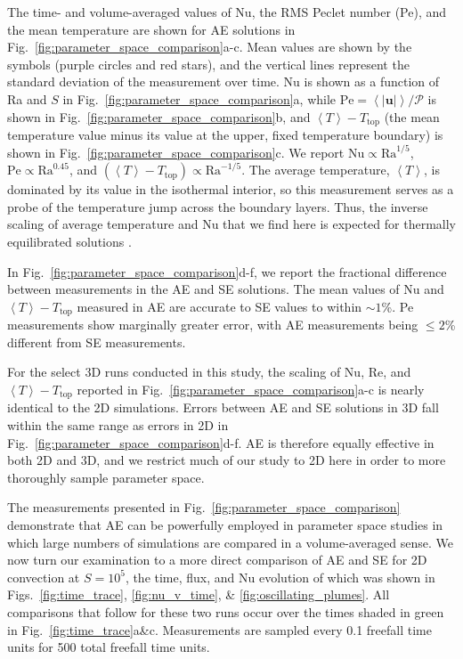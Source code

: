 \documentclass[aps, pre, onecolumn, nofootinbib, notitlepage, groupedaddress, amsfonts, amssymb, amsmath, longbibliography]{revtex4-1}
\newcommand{\angles}[1]{\ensuremath{\left\langle #1 \right\rangle}}
\begin{document}
The time- and volume-averaged values of Nu, the RMS
Peclet number (Pe), and the mean temperature 
are shown for AE solutions in Fig.~\ref{fig:parameter_space_comparison}a-c.
Mean values are shown by the symbols (purple circles and red stars), and 
the vertical lines represent the standard deviation of the measurement over time.
Nu is shown as a function of Ra and $S$ in 
Fig.~\ref{fig:parameter_space_comparison}a, while 
$\text{Pe} = \angles{|\bm{u}|} / \mathcal{P}$ is shown in 
Fig.~\ref{fig:parameter_space_comparison}b, and $\angles{T} - T_{\text{top}}$ 
(the mean temperature value minus its value at the upper, 
fixed temperature boundary) is shown in Fig.~\ref{fig:parameter_space_comparison}c.
We report $\text{Nu} \propto \text{Ra}^{1/5}$,
$\text{Pe} \propto \text{Ra}^{0.45}$, and 
$(\angles{T} - T_{\text{top}}) \propto \text{Ra}^{-1/5}$.
The average temperature, $\angles{T}$, 
is dominated by its value in the isothermal interior,
so this measurement serves as a probe of the temperature jump across the boundary
layers. Thus, the inverse scaling of average temperature and Nu that we
find here is expected for thermally equilibrated solutions \cite{otero&all2002}.

In Fig.~\ref{fig:parameter_space_comparison}d-f, we report the fractional difference
between measurements in the AE and SE solutions.
The mean values of Nu and $\angles{T} - T_{\text{top}}$ 
measured in AE are accurate to SE values to within $\sim 1$\%.
Pe measurements show marginally greater error, with AE measurements being 
$\leq 2$\% different from SE measurements.

For the select 3D runs conducted in this study, the scaling of Nu, Re, and $\angles{T} - T_{\text{top}}$
reported in Fig.~\ref{fig:parameter_space_comparison}a-c is nearly identical to the
2D simulations. Errors between AE and SE solutions in 3D fall within the same range as
errors in 2D in Fig.~\ref{fig:parameter_space_comparison}d-f. AE is therefore
equally effective in both 2D and 3D, and we restrict much of our study to 2D here
in order to more thoroughly sample parameter space.

The measurements presented in Fig.~\ref{fig:parameter_space_comparison} demonstrate
that AE can be powerfully employed in parameter space studies in which
large numbers of simulations are compared in a volume-averaged sense.  We now turn
our examination to a more direct comparison of AE and SE for 2D convection at
$S = 10^5$, the time, flux, and Nu evolution of which was shown in 
Figs.~\ref{fig:time_trace}, \ref{fig:nu_v_time}, \& \ref{fig:oscillating_plumes}.
All comparisons that follow for these two runs occur over the times shaded in
green in Fig.~\ref{fig:time_trace}a\&c. Measurements are sampled every
0.1 freefall time units for 500 total freefall time units.
\end{document}
